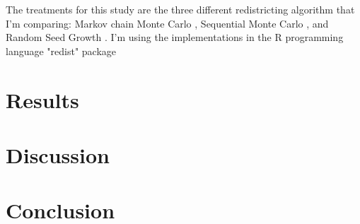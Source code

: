 \documentclass[stu, floatsintext]{apa7}
\begin{document}
The treatments for this study are the three different redistricting algorithm that I'm comparing: Markov chain Monte Carlo \parencite{fifield2020}, Sequential Monte Carlo \parencite{mccartan2020}, and Random Seed Growth \parencite{chen2013}. I'm using the implementations in the R programming language "redist" package \parencite{fifield2020d}

\section{Results}

\section{Discussion}

\section{Conclusion}
\printbibliography
\end{document}

